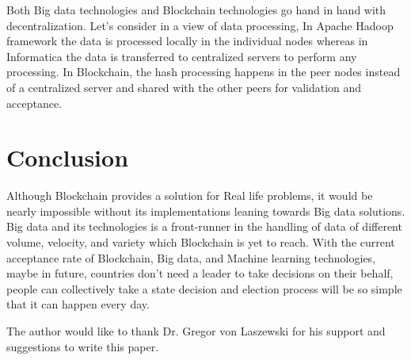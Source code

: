 \documentclass[sigconf]{acmart}
\begin{document}
Both Big data technologies and Blockchain technologies go hand in hand with decentralization. Let's consider in a view of data processing, In Apache Hadoop framework the data is processed locally in the individual nodes whereas in Informatica the data is transferred to centralized servers to perform any processing\cite{Informat9:online}. In Blockchain, the hash processing happens in the peer nodes instead of a centralized server and shared with the other peers for validation and acceptance.


\section{Conclusion}
Although Blockchain provides a solution for Real life problems, it would be nearly impossible without its implementations leaning towards Big data solutions. Big data and its technologies is a front-runner in the handling of data of different volume, velocity, and variety which Blockchain is yet to reach. With the current acceptance rate of Blockchain, Big data, and Machine learning technologies, maybe in future, countries don't need a leader to take decisions on their behalf, people can collectively take a state decision and election process will be so simple that it can happen every day.


\begin{acks}

  The author would like to thank Dr. Gregor von Laszewski for his
  support and suggestions to write this paper.

\end{acks}


 
\end{document}
